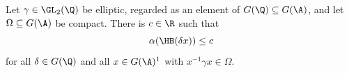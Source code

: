 Let $\gamma\in\GL_2(\Q)$ be elliptic, regarded as an element of $G(\Q)\subseteq G(\A)$, and let $\Omega\subseteq G(\A)$ be compact.
There is $c\in\R$ such that
\[
  \alpha(\HB(\delta x))\le c
\]
for all $\delta\in G(\Q)$ and all $x\in G(\A)^1$ with $x^{-1}\gamma x\in\Omega$.
